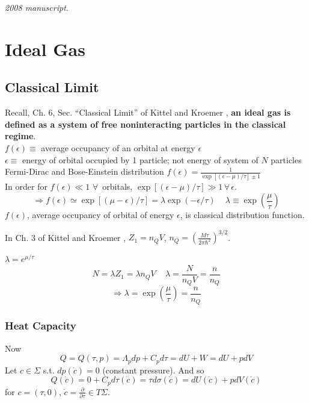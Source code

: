 \noindent\textit{2008 manuscript.}

\section{Ideal Gas}

\subsection*{Classical Limit}

Recall, Ch. 6, Sec. ``Classical Limit'' of Kittel and Kroemer \cite{CKittelHKroemer1980}, \textbf{an ideal gas is defined as a system of free noninteracting particles in the classical regime}.  \\
$f(\epsilon) \equiv $ average occupancy of an orbital at energy $\epsilon$ \\
$\epsilon \equiv $ energy of orbital occupied by 1 particle; not energy of system of $N$ particles \\
Fermi-Dirac and Bose-Einstein distribution $f(\epsilon) = \frac{1}{ \exp{ [ (\epsilon - \mu )/\tau ] } \pm 1 }$ \\
In order for $f(\epsilon) \ll 1$ $\forall \, $ orbitals, $\exp{ [ (\epsilon-\mu)/\tau ] } \gg 1\, \forall \, \epsilon$.  
\[
\Longrightarrow f(\epsilon) \simeq \exp{ [(\mu - \epsilon )/\tau]} = \lambda \exp{ (-\epsilon/\tau)} \quad \, \lambda \equiv \exp{ \left( \frac{ \mu }{\tau} \right) }
\]
$f(\epsilon)$, average occupancy of orbital of energy $\epsilon$, is classical distribution function.  

In Ch. 3 of Kittel and Kroemer \cite{CKittelHKroemer1980}, $Z_1 = n_Q V$, $n_Q = \left( \frac{M\tau}{ 2\pi \hbar^2} \right)^{3/2}$.

$\lambda = e^{\mu /\tau}$
\[
N=\lambda Z_1 = \lambda n_Q V \quad \,  \lambda = \frac{N}{n_Q V} = \frac{n}{n_Q}
\]
\[
\Longrightarrow \lambda = \exp{ \left( \frac{\mu}{\tau} \right)} = \frac{n}{n_Q}
\]

\subsubsection*{Heat Capacity}

Now 
\[
Q = Q(\tau,p) = \Lambda_p dp + C_p d\tau = dU + W = dU + p dV 
\]
Let $c\in \Sigma$ s.t. $dp(\dot{c})=0$ (constant pressure).  And so 
\[
Q(\dot{c}) = 0 + C_p d\tau(\dot{c}) = \tau d\sigma (\dot{c}) = dU(\dot{c}) + pdV(\dot{c})
\]
for $c=(\tau,0)$, $\dot{c} = \frac{\partial }{ \partial \tau} \in T\Sigma$.  

